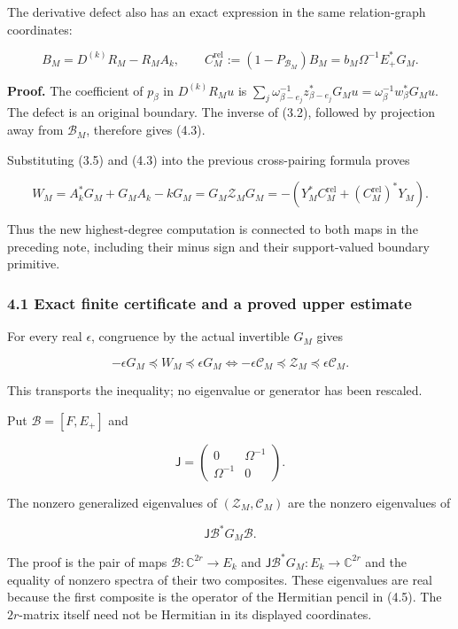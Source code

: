 \documentclass[
]{article}
\begin{document}
The derivative defect also has an exact expression in the same
relation-graph coordinates:

\[B_M=D^{(k)}R_M-R_MA_k,\qquad
\boxed{C_M^{\mathrm{rel}}:=(1-P_{\mathcal B_M})B_M=b_M\Omega^{-1}E_+^*G_M.}\tag{4.3}\]

\textbf{Proof.} The coefficient of \(p_\beta\) in \(D^{(k)}R_Mu\) is
\(\sum_j\omega_{\beta-e_j}^{-1}z_{\beta-e_j}^*G_Mu=\omega_\beta^{-1}w_\beta^*G_Mu\).
The defect is an original boundary. The inverse of (3.2), followed by
projection away from \(\mathcal B_M\), therefore gives (4.3).

Substituting (3.5) and (4.3) into the previous cross-pairing formula
proves

\[\boxed{W_M=A_k^*G_M+G_MA_k-kG_M
=G_M\mathcal Z_MG_M
=-(Y_M^*C_M^{\mathrm{rel}}+(C_M^{\mathrm{rel}})^*Y_M).}\tag{4.4}\]

Thus the new highest-degree computation is connected to both maps in the
preceding note, including their minus sign and their support-valued
boundary primitive.

\subsubsection{4.1 Exact finite certificate and a proved upper
estimate}\label{exact-finite-certificate-and-a-proved-upper-estimate}

For every real \(\epsilon\), congruence by the actual invertible \(G_M\)
gives

\[\boxed{-\epsilon G_M\preceq W_M\preceq\epsilon G_M
\iff -\epsilon\mathcal C_M\preceq\mathcal Z_M\preceq\epsilon\mathcal C_M.}\tag{4.5}\]

This transports the inequality; no eigenvalue or generator has been
rescaled.

Put \(\mathcal B=[F,E_+]\) and

\[\mathsf J=\begin{pmatrix}0&\Omega^{-1}\\\Omega^{-1}&0\end{pmatrix}.\]

The nonzero generalized eigenvalues of \((\mathcal Z_M,\mathcal C_M)\)
are the nonzero eigenvalues of

\[\boxed{\mathsf J\mathcal B^*G_M\mathcal B.}\tag{4.6}\]

The proof is the pair of maps \(\mathcal B:\mathbb C^{2r}\to E_k\) and
\(\mathsf J\mathcal B^*G_M:E_k\to\mathbb C^{2r}\) and the equality of
nonzero spectra of their two composites. These eigenvalues are real
because the first composite is the operator of the Hermitian pencil in
(4.5). The \(2r\)-matrix itself need not be Hermitian in its displayed
coordinates.
\end{document}
